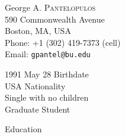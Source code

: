\documentclass[a4paper]{article}
\begin{document}
\noindent\hspace*{\tabcolsep}\begin{minipage}{0.4\linewidth}
{\large George A. \textsc{Pantelopulos}}\\
590 Commonwealth Avenue\\
Boston, MA, USA\\[3pt]
Phone: +1 (302) 419-7373 (cell)\\
Email: \texttt{gpantel@bu.edu}
\end{minipage}
\begin{minipage}{0.4\linewidth}
1991 May 28 Birthdate\\
USA Nationality\\
Single with no children\\
Graduate Student
\end{minipage}

\begin{rubrique}{Education}
\begin{sousrubrique}
\end{sousrubrique}

\begin{sousrubrique}
\end{sousrubrique}

\begin{sousrubrique}
\end{sousrubrique}
\end{rubrique}
\end{document}

